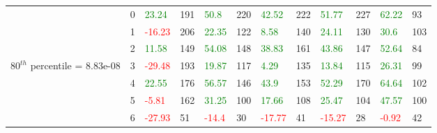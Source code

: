 \begin{table}[htb!]
\begin{adjustwidth}{-0.9in}{-0.9in}
\begin{tabular}{|p{5em}|p{2em}|p{3em}|p{3em}|p{3em}|p{3em}|p{3em}|p{3em}|p{3em}|p{3em}|p{3em}|p{3em}|}
            & 0 & \textcolor{green}{23.24} & 191 & \textcolor{green}{50.8} & 220 & \textcolor{green}{42.52} & 222 & \textcolor{green}{51.77} & 227 & \textcolor{green}{62.22} & 93\\\cline{3-12}
            & 1 & \textcolor{red}{-16.23} & 206 & \textcolor{green}{22.35} & 122 & \textcolor{green}{8.58} & 140 & \textcolor{green}{24.11} & 130 & \textcolor{green}{30.6} & 103\\\cline{3-12}
            & 2 & \textcolor{green}{11.58} & 149 & \textcolor{green}{54.08} & 148 & \textcolor{green}{38.83} & 161 & \textcolor{green}{43.86} & 147 & \textcolor{green}{52.64} & 84\\\cline{3-12}
            $80^{th}$ percentile = 8.83e-08 & 3 & \textcolor{red}{-29.48} & 193 & \textcolor{green}{19.87} & 117 & \textcolor{green}{4.29} & 135 & \textcolor{green}{13.84} & 115 & \textcolor{green}{26.31} & 99\\\cline{3-12}
            & 4 & \textcolor{green}{22.55} & 176 & \textcolor{green}{56.57} & 146 & \textcolor{green}{43.9} & 153 & \textcolor{green}{52.29} & 170 & \textcolor{green}{64.64} & 102\\\cline{3-12}
            & 5 & \textcolor{red}{-5.81} & 162 & \textcolor{green}{31.25} & 100 & \textcolor{green}{17.66} & 108 & \textcolor{green}{25.47} & 104 & \textcolor{green}{47.57} & 100\\\cline{3-12}
            & 6 & \textcolor{red}{-27.93} & 51 & \textcolor{red}{-14.4} & 30 & \textcolor{red}{-17.77} & 41 & \textcolor{red}{-15.27} & 28 & \textcolor{red}{-0.92} & 42\\\hline\hline


\end{tabular}
\end{adjustwidth}
\end{table}
